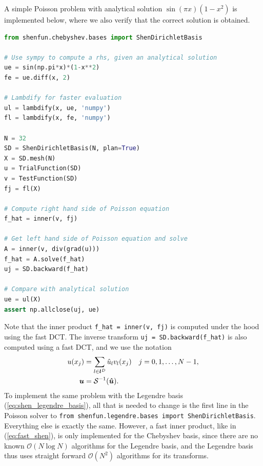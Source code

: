 \documentclass[%
oneside,                 %
final,                   %
10pt]{article}
\begin{document}
A simple Poisson problem with analytical solution $\sin(\pi x)(1-x^2)$ is implemented below, where we also verify that the correct solution is obtained.
\begin{lstlisting}[language=Python,style=yellow2_fb]
from shenfun.chebyshev.bases import ShenDirichletBasis

# Use sympy to compute a rhs, given an analytical solution
ue = sin(np.pi*x)*(1-x**2)
fe = ue.diff(x, 2)

# Lambdify for faster evaluation
ul = lambdify(x, ue, 'numpy')
fl = lambdify(x, fe, 'numpy')

N = 32
SD = ShenDirichletBasis(N, plan=True)
X = SD.mesh(N)
u = TrialFunction(SD)
v = TestFunction(SD)
fj = fl(X)

# Compute right hand side of Poisson equation
f_hat = inner(v, fj)

# Get left hand side of Poisson equation and solve
A = inner(v, div(grad(u)))
f_hat = A.solve(f_hat)
uj = SD.backward(f_hat)

# Compare with analytical solution
ue = ul(X)
assert np.allclose(uj, ue)
\end{lstlisting}
Note that the inner product \Verb!f_hat = inner(v, fj)! is computed under the hood using the fast DCT.  The inverse transform \Verb!uj = SD.backward(f_hat)! is also computed using a fast DCT, and we use the notation
\begin{align}
u(x_j) &= \sum_{l\in \boldsymbol{l}^D} \hat{u}_l v_l(x_j) \quad j=0,1,\ldots, N-1, \notag \\
\boldsymbol{u} &= \mathcal{S}^{-1}(\boldsymbol{\hat{u}}). \label{eq:fast_shen}
\end{align}
To implement the same problem with the Legendre basis (\ref{eq:shen_legendre_basis}), all that is needed to change is the first line in the Poisson solver to \texttt{from shenfun.legendre.bases import ShenDirichletBasis}. Everything else is exactly the same. However, a fast inner product, like in (\ref{eq:fast_shen}), is only implemented for the Chebyshev basis, since there are no known $\mathcal{O}(N \log N)$ algorithms for the Legendre basis, and the Legendre basis thus uses straight forward $\mathcal{O}(N^2)$ algorithms for its transforms.

\end{document}
